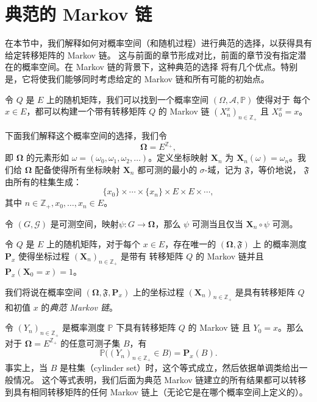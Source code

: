 \documentclass[fontset=none]{Notes}
\newcommand{\mat}[1]{\mathbold{#1}}
\newcommand{\matup}[1]{\mathbf{#1}}
\begin{document}
\section{典范的 Markov 链}

在本节中，我们解释如何对概率空间（和随机过程）进行典范的选择，以获得具有给定转移矩阵的 Markov 链。
这与前面的章节形成对比，前面的章节没有指定潜在的概率空间。在 Markov 链的背景下，这种典范的选择
将有几个优点。特别是，它将使我们能够同时考虑给定的 Markov 链和所有可能的初始点。

\begin{proposition}
  令 $Q$ 是 $E$ 上的随机矩阵，我们可以找到一个概率空间 $(\Omega,\mathcal{A},\mathbb{P})$ 使得对于
  每个 $x\in E$，都可以构建一个带有转移矩阵 $Q$ 的 Markov 链 $(X_n^x)_{n\in \mathbb{Z}_+}$ 且
  $X_0^x=x$。
\end{proposition}

下面我们解释这个概率空间的选择，我们令
\[
  \mat\Omega=E^{\mathbb{Z}_+},
\]
即 $\mat\Omega$ 的元素形如 $\omega=(\omega_0,\omega_1,\omega_2,\dots)$。定义坐标映射
$\mat X_n$ 为 $\mat X_n(\omega)=\omega_n$。我们给 $\mat\Omega$ 配备使得所有坐标映射
$\mat X_n$ 都可测的最小的 $\sigma$-域，记为 $\mathfrak{F}$，等价地说，
$\mathfrak{F}$ 由所有的柱集生成：
\[
  \{x_0\}\times\cdots\times\{x_n\}\times E\times E\times \cdots,
\]
其中 $n\in \mathbb{Z}_+,x_0,\dots,x_n\in E$。

\begin{lemma}
  令 $(G,\mathcal{G})$ 是可测空间，映射$\psi:G\to \mat\Omega$，那么
  $\psi$ 可测当且仅当 $\mat X_n\circ\psi$ 可测。
\end{lemma}

\begin{theorem}
  令 $Q$ 是 $E$ 上的随机矩阵，对于每个 $x\in E$，存在唯一的 $(\mat\Omega,\mathfrak F)$ 上
  的概率测度 $\matup P_x$ 使得坐标过程 $(\mat X_n)_{n\in \mathbb{Z}_+}$ 是带有
  转移矩阵 $Q$ 的 Markov 链并且 $\matup P_x(\mat X_0=x)=1$。
\end{theorem}
\begin{remark}
  我们将说在概率空间 $(\mat\Omega,\mathfrak F,\matup P_x)$ 上的坐标过程
  $(\mat X_n)_{n\in \mathbb{Z}_+}$ 是具有转移矩阵 $Q$ 和初值 $x$ 的\emph{典范 Markov 链}。
\end{remark}

\begin{remark}\label{rmk:canonical Markov}
  令 $(Y_n)_{n\in \mathbb{Z}_+}$ 是概率测度 $\mathbb{P}$ 下具有转移矩阵 $Q$ 的 Markov 链
  且 $Y_0=x$。那么对于 $\mat\Omega=E^{\mathbb{Z}_+}$ 的任意可测子集 $B$，有
  \[
    \mathbb{P}\bigl((Y_n)_{n\in \mathbb{Z}_+}\in B\bigr)=\matup P_x(B).
  \]
  事实上，当 $B$ 是柱集（cylinder set）时，这个等式成立，然后依据单调类给出一般情况。
  这个等式表明，我们后面为典范 Markov 链建立的所有结果都可以转移到具有相同转移矩阵的任何
  Markov 链上（无论它是在哪个概率空间上定义的）。
\end{remark}
\end{document}
